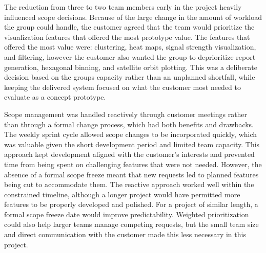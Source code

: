 The reduction from three to two team members early in the project heavily influenced scope decisions. Because of the large change in the amount of workload the group could handle, the customer agreed that the team would prioritize the visualization features that offered the most prototype value. The features that offered the most value were: clustering, heat maps, signal strength visualization, and filtering, however the customer also wanted the group to deprioritize report generation, hexagonal binning, and satellite orbit plotting. This was a deliberate decision based on the groups capacity rather than an unplanned shortfall, while keeping the delivered system focused on what the customer most needed to evaluate as a concept prototype.

Scope management was handled reactively through customer meetings rather than through a formal change process, which had both benefits and drawbacks. The weekly sprint cycle allowed scope changes to be incorporated quickly, which was valuable given the short development period and limited team capacity. This approach kept development aligned with the customer's interests and prevented time from being spent on challenging features that were not needed. However, the absence of a formal scope freeze meant that new requests led to planned features being cut to accommodate them. The reactive approach worked well within the constrained timeline, although a longer project would have permitted more features to be properly developed and polished. For a project of similar length, a formal scope freeze date would improve predictability. Weighted prioritization could also help larger teams manage competing requests, but the small team size and direct communication with the customer made this less necessary in this project.


